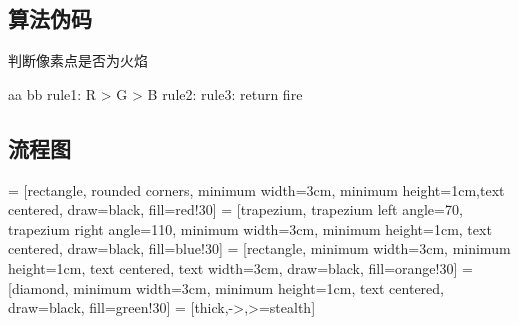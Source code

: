 \documentclass[12pt]{article}
\begin{document}
\subsection{算法伪码}

\begin{algorithm}[H]
    \caption{判断像素点是否为火焰}\label{ga-algo}
    \begin{algorithmic}[1]
        \Require aa
        \Ensure bb
        \State rule1: R > G > B
        \State rule2: 
        \State rule3: 
        \State return fire
        \EndIf 
        \EndProcedure
    \end{algorithmic}
\end{algorithm}

\subsection{流程图}

 = [rectangle, rounded corners, minimum width=3cm, minimum height=1cm,text centered, draw=black, fill=red!30]
 = [trapezium, trapezium left angle=70, trapezium right angle=110, minimum width=3cm, minimum height=1cm, text centered, draw=black, fill=blue!30]
 = [rectangle, minimum width=3cm, minimum height=1cm, text centered, text width=3cm, draw=black, fill=orange!30]
 = [diamond, minimum width=3cm, minimum height=1cm, text centered, draw=black, fill=green!30]
 = [thick,->,>=stealth]
\end{document}
